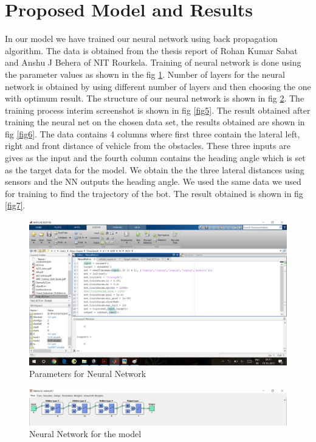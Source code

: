 \documentclass[a4paper, 12pt]{article}
\begin{document}
\section{Proposed Model and Results}
In our model we have trained our neural network using back propagation algorithm. The data is obtained from the thesis report of Rohan Kumar Sabat and Anshu J Behera of NIT Rourkela. Training of neural network is done using the parameter values as shown in the fig \ref{fig3}. Number of layers for the neural network is obtained by using different number of layers and then choosing the one with optimum result. The structure of our neural network is shown in fig \ref{fig4}. The training process interim screenshot is shown in fig \ref{fig5}. The result obtained after training the neural net on the chosen data set, the results obtained are shown in fig \ref{fig6}. The data contains 4 columns where first three contain the lateral left, right and front distance of vehicle from the obstacles. These three inputs are gives as the input and the fourth column contains the heading angle which is set as the target data for the model. We obtain the the three lateral distances using sensors and the NN outputs the heading angle. We used the same data we used for training to find the trajectory of the bot. The result obtained is shown in fig \ref{fig7}.
\begin{figure}[!h]
\includegraphics[height =3 in, width = \linewidth]{Neural_Net_code.png}
\caption{Parameters for Neural Network}
\label{fig3} 
\end{figure}

\begin{figure}[!h]
\includegraphics[height =2 in, width = \linewidth]{Layer_Struct}
\caption{Neural Network for the model}
\label{fig4}
\end{figure}
\end{document}
